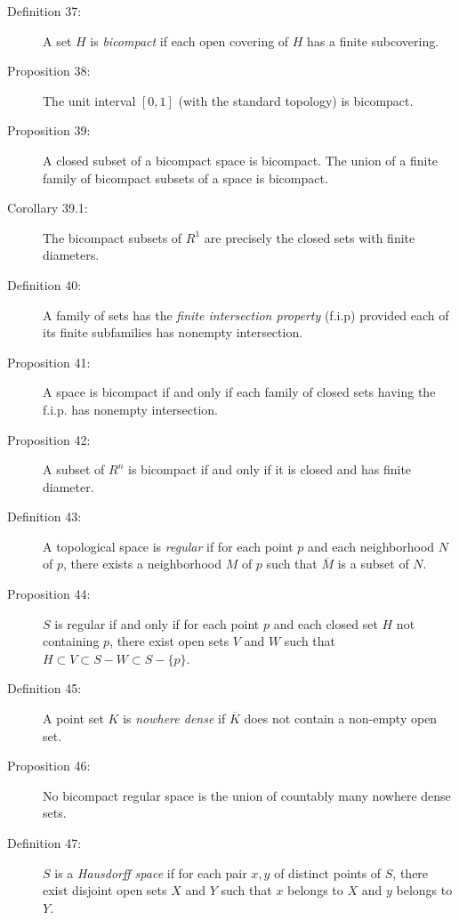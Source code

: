 \documentclass{article}
\begin{document}
\begin{description}
  \item[Definition 37:] A set $H$ is \emph{bicompact} if each open covering of $H$ has a finite subcovering.

  \item[Proposition 38:] The unit interval $[0,1]$ (with the standard topology) is bicompact.

  \item[Proposition 39:] A closed subset of a bicompact space is bicompact. The union of a finite family of bicompact subsets of a space is bicompact.

  \item[Corollary 39.1:] The bicompact subsets of $R^1$ are precisely the closed sets with finite diameters.

  \item[Definition 40:] A family of sets has the \emph{finite intersection property} (f.i.p) provided each of its finite subfamilies has nonempty intersection.

  \item[Proposition 41:] A space is bicompact if and only if each family of closed sets having the f.i.p. has nonempty intersection.

  \item[Proposition 42:] A subset of $R^n$ is bicompact if and only if it is closed and has finite diameter.

  \item[Definition 43:] A topological space is \emph{regular} if for each point $p$ and each neighborhood $N$ of $p$, there exists a neighborhood $M$ of $p$ such that $\overline{M}$ is a subset of $N$.

  \item[Proposition 44:] $S$ is regular if and only if for each point $p$ and each closed set $H$ not containing $p$, there exist open sets $V$ and $W$ such that $H \subset V \subset S - W \subset S - \{ p \}$.

  \item[Definition 45:] A point set $K$ is \emph{nowhere dense} if $\overline K$ does not contain a non-empty open set.

  \item[Proposition 46:] No bicompact regular space is the union of countably many nowhere dense sets.

  \item[Definition 47:] $S$ is a \emph{Hausdorff space} if for each pair $x,y$ of distinct points of $S$, there exist disjoint open sets $X$ and $Y$ such that $x$ belongs to $X$ and $y$ belongs to $Y$.


\end{description}
\end{document}
